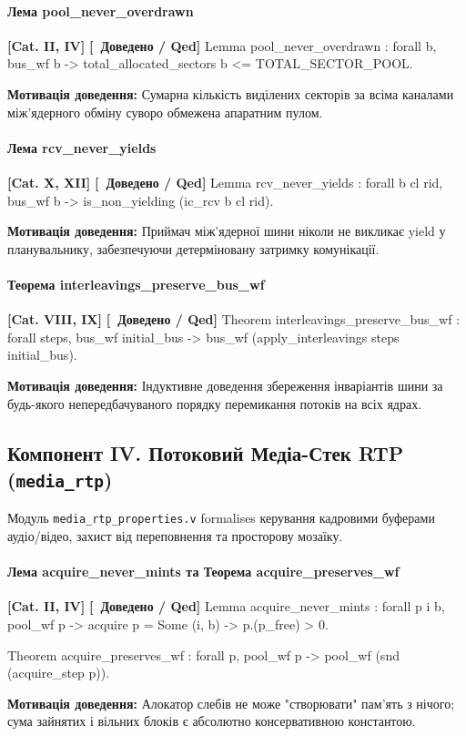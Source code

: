 \documentclass{article}
\let\originalfootnotesize\footnotesize
\let\oldverbatim\verbatim
\let\oldendverbatim\endverbatim
\renewenvironment{verbatim}{\originalfootnotesize\oldverbatim}{\oldendverbatim}
\newcommand{\thmcategory}[1]{{\small\textbf{\color{coreblue}[#1]}}}
\newcommand{\thmproven}{{\small\textbf{\color{productgreen}[\checkmark\ Доведено / Qed]}}}
\newcommand{\thmmotivation}[1]{%
  \par\smallskip\noindent\colorbox{boxbg}{\parbox{\dimexpr\linewidth-2\fboxsep\relax}{%
    \small\textbf{Мотивація доведення:} #1%
  }}\par\medskip
}
\begin{document}
\paragraph{Лема pool\_never\_overdrawn} \thmcategory{Cat. II, IV} \thmproven
\begin{verbatim}
Lemma pool_never_overdrawn : forall b,
  bus_wf b -> total_allocated_sectors b <= TOTAL_SECTOR_POOL.
\end{verbatim}
\thmmotivation{Сумарна кількість виділених секторів за всіма каналами між'ядерного обміну суворо обмежена апаратним пулом.}

\paragraph{Лема rcv\_never\_yields} \thmcategory{Cat. X, XII} \thmproven
\begin{verbatim}
Lemma rcv_never_yields : forall b cl rid,
  bus_wf b -> is_non_yielding (ic_rcv b cl rid).
\end{verbatim}
\thmmotivation{Приймач між'ядерної шини ніколи не викликає yield у планувальнику, забезпечуючи детерміновану затримку комунікації.}

\paragraph{Теорема interleavings\_preserve\_bus\_wf} \thmcategory{Cat. VIII, IX} \thmproven
\begin{verbatim}
Theorem interleavings_preserve_bus_wf : forall steps,
  bus_wf initial_bus -> bus_wf (apply_interleavings steps initial_bus).
\end{verbatim}
\thmmotivation{Індуктивне доведення збереження інваріантів шини за будь-якого непередбачуваного порядку перемикання потоків на всіх ядрах.}

\subsection[Компонент IV. Потоковий Медіа-Стек RTP]{Компонент IV. Потоковий Медіа-Стек RTP (\texttt{media\_rtp})}

Модуль \texttt{media\_rtp\_properties.v} formalises керування кадровими буферами аудіо/відео, захист від переповнення та просторову мозаїку.

\paragraph{Лема acquire\_never\_mints та Теорема acquire\_preserves\_wf} \thmcategory{Cat. II, IV} \thmproven
\begin{verbatim}
Lemma acquire_never_mints : forall p i b,
  pool_wf p -> acquire p = Some (i, b) ->
  p.(p_free) > 0.

Theorem acquire_preserves_wf : forall p,
  pool_wf p -> pool_wf (snd (acquire_step p)).
\end{verbatim}
\thmmotivation{Алокатор слебів не може "створювати" пам'ять з нічого; сума зайнятих і вільних блоків є абсолютно консервативною константою.}
\end{document}
